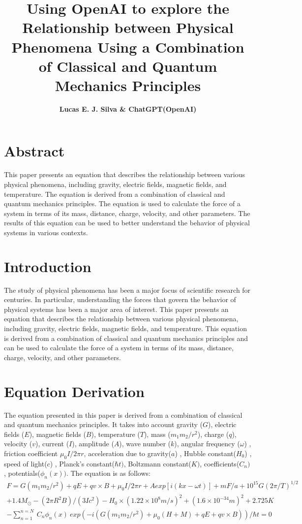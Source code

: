 \documentclass[12pt]{article}
\title{\textbf{Using OpenAI to explore the Relationship between Physical Phenomena Using a Combination of Classical and Quantum Mechanics Principles}}
\author{\textbf{Lucas E. J. Silva \& ChatGPT(OpenAI)}}
\begin{document}
 

    \maketitle

    \section*{Abstract}

    This paper presents an equation that describes the relationship between various physical phenomena, 
  including gravity, electric fields, magnetic fields, and temperature. The equation is derived from a combination 
  of classical and quantum mechanics principles. The equation is used to calculate the force of a system in terms 
  of its mass, distance, charge, velocity, and other parameters. The results of this equation can be used to better 
  understand the behavior of physical systems in various contexts. 

    \section*{Introduction}

    The study of physical phenomena has been a major focus of scientific research for centuries. 
  In particular, understanding the forces that govern the behavior of physical systems has been a major 
  area of interest. This paper presents an equation that describes the relationship between various physical 
  phenomena, including gravity, electric fields, magnetic fields, and temperature. This equation is derived 
  from a combination of classical and quantum mechanics principles and can be used to calculate the force of 
  a system in terms of its mass, distance, charge, velocity, and other parameters. 

    \section*{Equation Derivation} 
    The equation presented in this paper is derived from a combination of classical and quantum mechanics 
  principles. It takes into account gravity ($G$), electric fields ($E$), magnetic fields ($B$), temperature ($T$), 
  mass ($m_1m_2/r^2$), charge ($q$), velocity ($v$), current ($I$), amplitude ($A$), wave number ($k$), angular 
  frequency ($\omega$) , friction coefficient $\mu_0I/2\pi r$, acceleration due to gravity($a$) , Hubble 
  constant($H_0$) , speed of light($c$) , Planck's constant($\hbar t)$, Boltzmann constant($K)$, coefficients($C_n)$, 
  potentials($\phi_n(x))$. 
  The equation is as follows:
  \begin{multline*}
  F = G(m_1m_2/r^2) + qE + qv \times B + \mu_0I/2\pi r + Aexp[i(kx-\omega t)] + mF/a + 10^{15} G (2\pi/T)^{1/2} \\
  + 1.4M_{\odot} - (2\pi R^2B)/(3Ic^2) - H_0 \times (1.22 \times 10^8 m/s)^2 + (1.6 \times 10^{-34} m)^2 + 2.725 K \\
  - \sum_{n=1}^{n=N}\ C_n \phi_n(x)\ exp(-i(G(m_{1}m_{2}/r^2)+ \mu_{0}(H+M)+ qE+ qv \times B))/{\hbar t = 0}
   \end{multline*}
\end{document}
